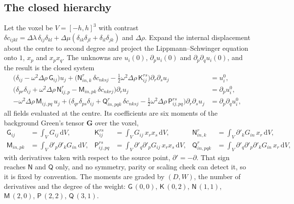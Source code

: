 \documentclass[extra,mreferee]{gji}
\newcommand{\bG}{\mathbf{G}}
\begin{document}
\subsection{The closed hierarchy}\label{sec:hierarchy}

Let the voxel be $V=[-h,h]^3$ with contrast
$\delta c_{ijkl}=\Delta\lambda\,\delta_{ij}\delta_{kl}+\Delta\mu(\delta_{ik}\delta_{jl}+\delta_{il}\delta_{jk})$
and $\Delta\rho$. Expand the internal displacement about the centre to second degree and project
the Lippmann--Schwinger equation onto $1$, $x_p$ and $x_px_q$. The unknowns are $u_i(0)$,
$\partial_pu_i(0)$ and $\partial_p\partial_qu_i(0)$, and the result is the closed system
\begin{align}
\bigl(\delta_{ij}-\omega^2\Delta\rho\,\mathsf G_{ij}\bigr)u_j
  +\bigl(\mathsf N^{r}_{in,k}\,\delta c_{nksj}-\tfrac12\omega^2\Delta\rho\,\mathsf K^{rs}_{ij}\bigr)
  \partial_r\partial_su_j
  &= u^0_i, \label{eq:A11}\\
\bigl(\delta_{pr}\delta_{ij}+\omega^2\Delta\rho\,\mathsf N^{r}_{ij,p}
  -\mathsf M_{in,pk}\,\delta c_{nkrj}\bigr)\partial_ru_j
  &= \partial_pu^0_i, \label{eq:A22}\\
-\omega^2\Delta\rho\,\mathsf M_{ij,pq}\,u_j
  +\bigl(\delta_{qr}\delta_{ps}\delta_{ij}+\mathsf Q^{r}_{in,pqk}\,\delta c_{nksj}
  -\tfrac12\omega^2\Delta\rho\,\mathsf P^{rs}_{ij,pq}\bigr)\partial_r\partial_su_j
  &= \partial_p\partial_qu^0_i, \label{eq:A33}
\end{align}
all fields evaluated at the centre. Its coefficients are six moments of the background Green's
tensor $\bG$ over the voxel,
\begin{equation}\label{eq:moments}
\begin{aligned}
\mathsf G_{ij}&=\int_V G_{ij}\,\mathrm{d}V, &
\mathsf K^{rs}_{ij}&=\int_V G_{ij}\,x_rx_s\,\mathrm{d}V, &
\mathsf N^{r}_{in,k}&=\int_V \partial'_kG_{in}\,x_r\,\mathrm{d}V,\\
\mathsf M_{in,pk}&=\int_V \partial'_p\partial'_kG_{in}\,\mathrm{d}V, &
\mathsf P^{rs}_{ij,pq}&=\int_V \partial'_q\partial'_pG_{ij}\,x_rx_s\,\mathrm{d}V, &
\mathsf Q^{r}_{in,pqk}&=\int_V \partial'_q\partial'_p\partial'_kG_{in}\,x_r\,\mathrm{d}V,
\end{aligned}
\end{equation}
with derivatives taken with respect to the source point, $\partial'=-\partial$. That sign reaches
$\mathsf N$ and $\mathsf Q$ only, and no symmetry, parity or scaling check can detect it, so it is
fixed by convention. The moments are graded by $(D,W)$, the number of derivatives and the degree of
the weight: $\mathsf G\,(0,0)$, $\mathsf K\,(0,2)$, $\mathsf N\,(1,1)$, $\mathsf M\,(2,0)$,
$\mathsf P\,(2,2)$, $\mathsf Q\,(3,1)$.
\end{document}
